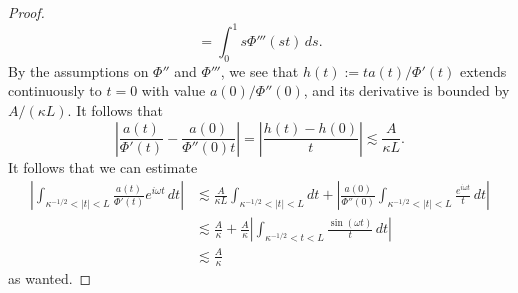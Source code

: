 \documentclass[11pt]{amsart}
\theoremstyle{definition}
\theoremstyle{remark}
\numberwithin{equation}{section}
\begin{document}
\begin{proof}
\[        =\int_0^1s\Phi'''(st)\,ds.
    \]
    By the assumptions on $\Phi''$ and $\Phi'''$, we see that $h(t) := ta(t)/\Phi'(t)$ extends continuously to $t=0$ with value $a(0)/\Phi''(0)$, and its derivative is bounded by $A/(\kappa L)$. It follows that
    \[
        \left|\frac{a(t)}{\Phi'(t)}-\frac{a(0)}{\Phi''(0)t}\right| = \left|\frac{h(t) - h(0)}{t}\right|
        \lesssim\frac{A}{\kappa L}.
    \]
    It follows that we can estimate
    \begin{align*}
        \left|\int_{\kappa^{-1/2}<|t|<L}\frac{a(t)}{\Phi'(t)}e^{i\omega t}\,dt\right|
        &\lesssim\frac{A}{\kappa L}\int_{\kappa^{-1/2}<|t|<L}dt
        +\left|\frac{a(0)}{\Phi''(0)}\int_{\kappa^{-1/2}<|t|<L}\frac{e^{i\omega t}}t\,dt\right|\\
        &\lesssim\frac{A}{\kappa}+\frac{A}{\kappa}\left|\int_{\kappa^{-1/2}<t<L}\frac{\sin(\omega t)}{ t}\,dt\right| \\
        & \lesssim \frac{A}{\kappa}
    \end{align*}
    as wanted.
\end{proof}
\end{document}
